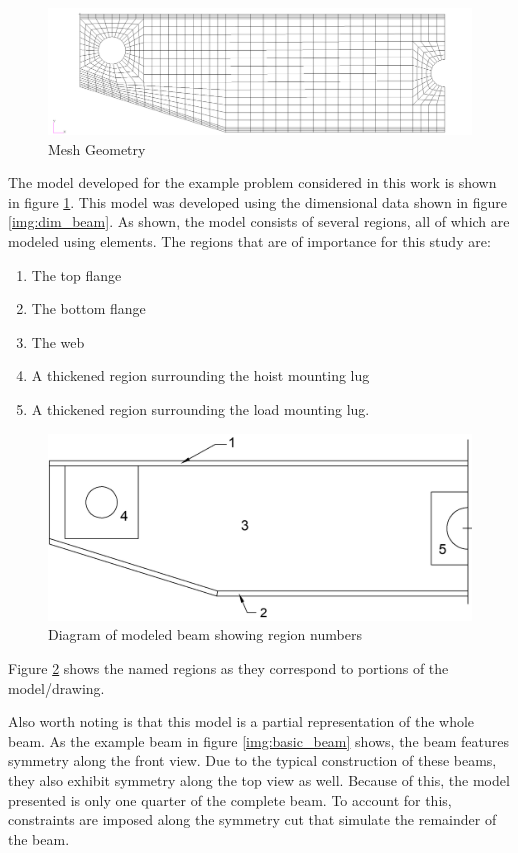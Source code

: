 \begin{figure}
\includegraphics[width=\textwidth]{img/mesh_geom.png}
\caption{Mesh Geometry}
\label{img:mesh_geom}
\end{figure}

The model developed for the example problem considered in this work is shown in figure \ref{img:mesh_geom}. This model was developed using the dimensional data shown in figure \ref{img:dim_beam}. As shown, the model consists of several regions, all of which are modeled using  elements. The regions that are of importance for this study are: 

\begin{enumerate}
  \item The top flange
  \item The bottom flange
  \item The web
  \item A thickened region surrounding the hoist mounting lug
  \item A thickened region surrounding the load mounting lug. 
\end{enumerate}

\begin{figure}
\includegraphics[width=\textwidth]{img/numbered_geom.png}
\caption{Diagram of modeled beam showing region numbers}
\label{img:num_geom}
\end{figure}

Figure \ref{img:num_geom} shows the named regions as they correspond to portions of the model/drawing. 

Also worth noting is that this model is a partial representation of the whole beam. As the example beam in figure \ref{img:basic_beam} shows, the beam features symmetry along the front view. Due to the typical construction of these beams, they also exhibit symmetry along the top view as well. Because of this, the model presented is only one quarter of the complete beam. To account for this, constraints are imposed along the symmetry cut that simulate the remainder of the beam. 

